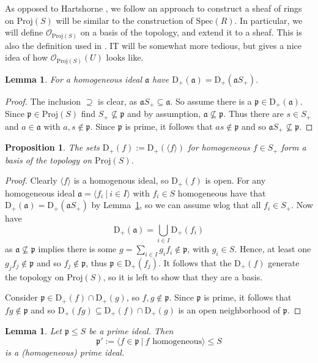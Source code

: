 \documentclass{scrartcl}
\newcommand{\D}[1]{\mathrm{D}_+(#1)}
\newcommand{\p}{\mathfrak{p}}
\renewcommand{\a}{\mathfrak{a}}
\newcommand{\Spec}{\mathrm{Spec}}
\newcommand{\Proj}{\mathrm{Proj}}
\renewcommand{\O}{\mathcal{O}}
\newcommand{\citestacks}[1]{\cite[\href{https://stacks.math.columbia.edu/tag/#1}{Tag #1}]{stacks}}
\newtheorem{prop}[subsection]{Proposition}
\newtheorem{lemma}[subsection]{Lemma}
\theoremstyle{definition}
\begin{document}
As opposed to Hartshorne \cite{hartshorne}, we follow an approach to construct a sheaf of rings on $\Proj(S)$ will be similar to the construction of $\Spec(R)$.
In particular, we will define $\O_{\Proj(S)}$ on a basis of the topology, and extend it to a sheaf.
This is also the definition used in \citestacks{01M6}.
IT will be somewhat more tedious, but gives a nice idea of how $\O_{\Proj(S)}(U)$ looks like.
\begin{lemma}
    \label{prop:Splus_invariance}
    For a homogeneous ideal $\a$ have $\D{\a} = \D{\a S_+}$.
\end{lemma}
\begin{proof}
    The inclusion $\supseteq$ is clear, as $\a S_+ \subseteq \a$.
    So assume there is a $\p \in \D{\a}$.
    Since $\p \in \Proj(S)$ find $S_+ \not\subseteq \p$ and by assumption, $\a \not\subseteq \p$.
    Thus there are $s \in S_+$ and $a \in \a$ with $a, s \notin \p$.
    Since $\p$ is prime, it follows that $as \notin \p$ and so $\a S_+ \not\subseteq \p$.
\end{proof}
\begin{prop}
    \label{prop:basis_topology}
    The sets $\D{f} := \D{\langle f \rangle}$ for homogeneous $f \in S_+$ form a basis of the topology on $\Proj(S)$.
\end{prop}
\begin{proof}
    Clearly $\langle f \rangle$ is a homogenous ideal, so $\D{f}$ is open.
    For any homogeneous ideal $\a = \langle f_i \ | \ i \in I \rangle$ with $f_i \in S$ homogeneous have that $\D{\a} = \D{\a S_+}$ by Lemma~\ref{prop:Splus_invariance}, so we can assume wlog that all $f_i \in S_+$.
    Now have
    \begin{equation*}
        \D{\a} = \bigcup_{i \in I} \D{f_i}
    \end{equation*}
    as $\a \not\subseteq \p$ implies there is some $g = \sum_{i \in I} g_i f_i \notin \p$, with $g_i \in S$.
    Hence, at least one $g_j f_j \notin \p$ and so $f_j \notin \p$, thus $\p \in \D{f_j}$.
    It follows that the $\D{f}$ generate the topology on $\Proj(S)$, so it is left to show that they are a basis.

    Consider $\p \in \D{f} \cap \D{g}$, so $f, g \notin \p$.
    Since $\p$ is prime, it follows that $fg \notin \p$ and so $\D{fg} \subseteq \D{f} \cap \D{g}$ is an open neighborhood of $\p$.
\end{proof}
\begin{lemma}
    \label{prop:homogeneous_part_prime}
    Let $\p \leq S$ be a prime ideal.
    Then
    \begin{equation*}
        \p' := \langle f \in \p \ | \ \text{$f$ homogeneous} \rangle \leq S
    \end{equation*}
    is a (homogeneous) prime ideal.
\end{lemma}
\end{document}
